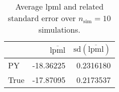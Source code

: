 \begin{table}[H]

\caption{Average lpml and related standard error over $n_{\text{sim}} = 10$ simulations.}
\centering
\begin{tabular}[t]{lrr}
\toprule
  & $\overbar{\text{lpml}}$ & $\text{sd}(\overbar{\text{lpml}})$\\
\midrule
PY & -18.36225 & 0.2316180\\
True & -17.87095 & 0.2173537\\
\bottomrule
\end{tabular}
\end{table}